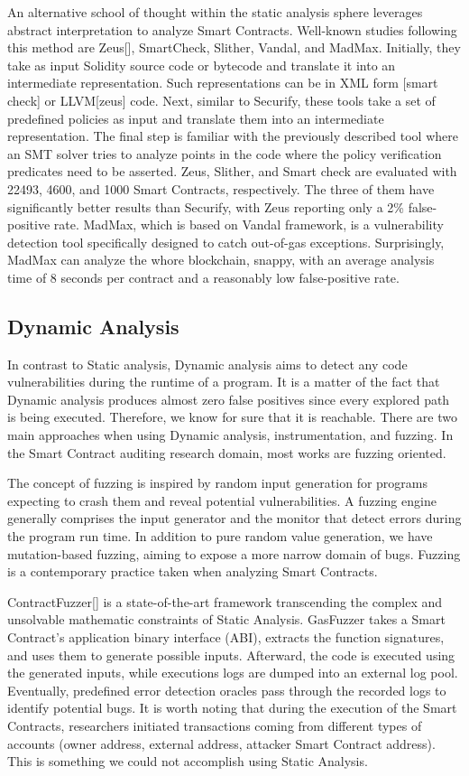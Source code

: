 \documentclass[a4paper,11pt]{article}
\begin{document}
An alternative school of thought within the static analysis sphere leverages
abstract interpretation to analyze Smart Contracts. Well-known studies following
this method are Zeus[], SmartCheck, Slither, Vandal, and MadMax. Initially, they
take as input Solidity source code or bytecode and translate it into an
intermediate representation. Such representations can be in XML form [smart
check] or LLVM[zeus] code. Next, similar to Securify, these tools take a set of
predefined policies as input and translate them into an intermediate
representation. The final step is familiar with the previously described tool
where an SMT solver tries to analyze points in the code where the policy
verification predicates need to be asserted. Zeus, Slither, and Smart check are
evaluated with 22493, 4600, and 1000 Smart Contracts, respectively. The three of
them have significantly better results than Securify, with Zeus reporting only a
2\% false-positive rate. MadMax, which is based on Vandal framework, is a
vulnerability detection tool specifically designed to catch out-of-gas
exceptions. Surprisingly, MadMax can analyze the whore blockchain, snappy, with
an average analysis time of 8 seconds per contract and a reasonably low
false-positive rate.

\subsection{Dynamic Analysis}
In contrast to Static analysis, Dynamic analysis aims to detect any code
vulnerabilities during the runtime of a program. It is a matter of the fact that
Dynamic analysis produces almost zero false positives since every explored path
is being executed. Therefore, we know for sure that it is reachable. There are
two main approaches when using Dynamic analysis, instrumentation, and fuzzing.
In the Smart Contract auditing research domain, most works are fuzzing oriented.

The concept of fuzzing is inspired by random input generation for programs
expecting to crash them and reveal potential vulnerabilities. A fuzzing engine
generally comprises the input generator and the monitor that detect errors
during the program run time. In addition to pure random value generation, we
have mutation-based fuzzing, aiming to expose a more narrow domain of bugs.
Fuzzing is a contemporary practice taken when analyzing Smart Contracts. 

ContractFuzzer[] is a state-of-the-art framework transcending the complex and
unsolvable mathematic constraints of Static Analysis. GasFuzzer takes a Smart
Contract's application binary interface (ABI), extracts the function signatures,
and uses them to generate possible inputs. Afterward, the code is executed using
the generated inputs, while executions logs are dumped into an external log
pool. Eventually, predefined error detection oracles pass through the recorded
logs to identify potential bugs. It is worth noting that during the execution of
the Smart Contracts, researchers initiated transactions coming from different
types of accounts (owner address, external address, attacker Smart Contract
address). This is something we could not accomplish using Static Analysis. 
\end{document}
